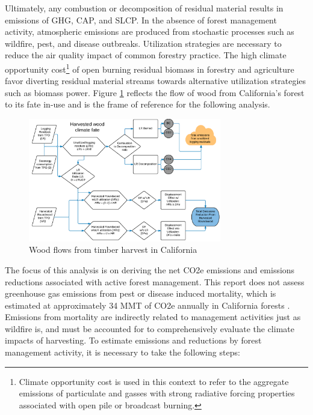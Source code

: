 \documentclass[a4paper,titlepage]{article}
\begin{document}
Ultimately, any combustion or decomposition of residual material results in emissions of \ac{GHG}, \ac{CAP}, and \ac{SLCP}. In the absence of forest management activity, atmospheric emissions are produced from stochastic processes such as wildfire, pest, and disease outbreaks. Utilization strategies are necessary to reduce the air quality impact of common forestry practice. The high climate opportunity cost\footnote{Climate opportunity cost is used in this context to refer to the aggregate emissions of particulate and gasses with strong radiative forcing properties associated with open pile or broadcast burning.} of open burning residual biomass in forestry and agriculture favor diverting residual material streams towards alternative utilization strategies such as biomass power. Figure \ref{fig:flow_chart} reflects the flow of wood
from California's forest to its fate in-use and is the frame of
reference for the following analysis.

\begin{figure}[htb]
\centering
\includegraphics[width=0.75\textwidth]{./graphics/flow_chart.pdf}
\caption{Wood flows from timber harvest in California \label{fig:flow_chart}}
\end{figure}

The focus of this analysis is on deriving the net \ac{CO2e} emissions and emissions reductions associated with active forest management. This report does not assess greenhouse gas emissions from pest or disease induced mortality, which is estimated at approximately 34 MMT of \ac{CO2e} annually in California forests \cite{Christensen2016}. Emissions from mortality are indirectly related to management activities just as wildfire is, and must be accounted for to comprehensively evaluate the climate impacts of harvesting. To estimate emissions and reductions by forest  management activity, it is necessary to take the following steps:
\end{document}
